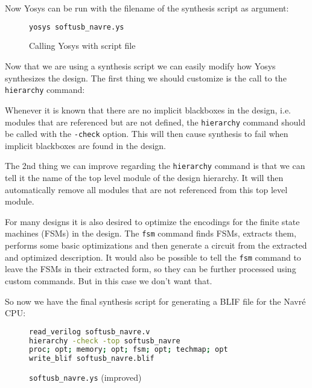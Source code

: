 \documentclass[9pt,technote,a4paper]{IEEEtran}
\begin{document}
Now Yosys can be run with the filename of the synthesis script as argument:

\begin{figure}[H]
\begin{lstlisting}[language=sh]
yosys softusb_navre.ys
\end{lstlisting}
 \renewcommand{\figurename}{Listing}
\caption{Calling Yosys with script file}
\end{figure}

\medskip

Now that we are using a synthesis script we can easily modify how Yosys
synthesizes the design. The first thing we should customize is the
call to the {\tt hierarchy} command:

Whenever it is known that there are no implicit blackboxes in the design, i.e.
modules that are referenced but are not defined, the {\tt hierarchy} command
should be called with the {\tt -check} option. This will then cause synthesis
to fail when implicit blackboxes are found in the design.

The 2nd thing we can improve regarding the {\tt hierarchy} command is that we
can tell it the name of the top level module of the design hierarchy. It will
then automatically remove all modules that are not referenced from this top
level module.

\medskip

For many designs it is also desired to optimize the encodings for the finite
state machines (FSMs) in the design. The {\tt fsm} command finds FSMs, extracts
them, performs some basic optimizations and then generate a circuit from
the extracted and optimized description. It would also be possible to tell
the {\tt fsm} command to leave the FSMs in their extracted form, so they can be
further processed using custom commands. But in this case we don't want that.

\medskip

So now we have the final synthesis script for generating a BLIF file
for the Navr\'e CPU:

\begin{figure}[H]
\begin{lstlisting}[language=sh]
read_verilog softusb_navre.v
hierarchy -check -top softusb_navre
proc; opt; memory; opt; fsm; opt; techmap; opt
write_blif softusb_navre.blif
\end{lstlisting}
 \renewcommand{\figurename}{Listing}
\caption{{\tt softusb\_navre.ys} (improved)}
\end{figure}
\end{document}
